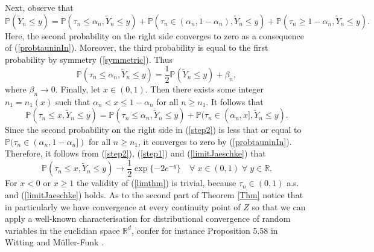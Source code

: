 \documentclass[sn-mathphys,Numbered]{sn-jnl}%
\theoremstyle{thmstyleone}%
\theoremstyle{thmstyletwo}%
\theoremstyle{thmstylethree}%
\begin{document}
Next, observe that
$$
 \mathbb{P}(\tilde{Y}_n \le y)=\mathbb{P}(\tau_n \le \alpha_n, \tilde{Y}_n \le y)+\mathbb{P}(\tau_n \in (\alpha_n,1-\alpha_n),\tilde{Y}_n \le y)+\mathbb{P}(\tau_n \ge 1-\alpha_n, \tilde{Y}_n \le y).
$$
Here, the second probability on the right side converges to zero as a consequence of (\ref{probtauninIn}). Moreover, the third probability is
equal to the first probability by symmetry (\ref{symmetric}). Thus
\begin{equation} \label{step1}
 \mathbb{P}(\tau_n \le \alpha_n, \tilde{Y}_n \le y)= \frac{1}{2} \mathbb{P}(\tilde{Y}_n \le y)+ \beta_n,
\end{equation}
where $\beta_n \rightarrow 0$. Finally, let $x \in (0,1)$. Then there exists some integer $n_1=n_1(x)$ such that $\alpha_n <x \le 1-\alpha_n$ for all $n \ge n_1$.
It follows that
\begin{equation} \label{step2}
 \mathbb{P}(\tau_n \le x,\tilde{Y}_n \le y)=\mathbb{P}(\tau_n \le \alpha_n,\tilde{Y}_n \le y)+\mathbb{P}(\tau_n \in (\alpha_n,x],\tilde{Y}_n \le y).
\end{equation}
Since the second probability on the right side in (\ref{step2}) is less that or equal to $\mathbb{P}(\tau_n \in (\alpha_n,1-\alpha_n])$ for all $n \ge n_1$, it converges to zero by (\ref{probtauninIn}). Therefore, it follows from (\ref{step2}), (\ref{step1}) and (\ref{limitJaeschke}) that
$$
 \mathbb{P}(\tau_n \le x,\tilde{Y}_n \le y) \rightarrow \frac{1}{2} \exp\{-2 e^{-y}\} \quad \forall \; x \in (0,1) \; \forall \; y \in \mathbb{R}.
$$
For $x<0$ or $x \ge 1$ the validity of (\ref{limthm}) is trivial, because $\tau_n \in (0,1)$ a.s. and (\ref{limitJaeschke}) holds. As to the second part of Theorem \ref{Thm} notice that in particularly we have
convergence at every continuity point of $Z$ so that we can apply a well-known characterisation for distributional convergence of random variables in the euclidian space $\mathbb{R}^d$, confer for instance Proposition 5.58 in Witting and M\"{u}ller-Funk \cite{Witting}.






\end{document}
